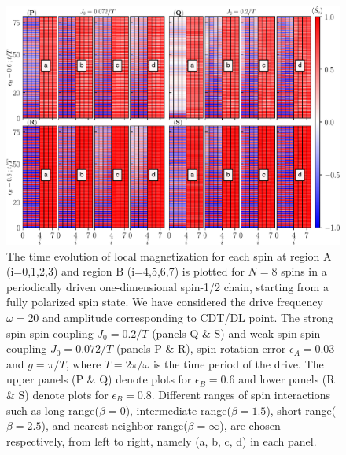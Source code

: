 \documentclass[12pt]{iopart}
\begin{document}
\begin{figure}[t!]
	\centering
	\hspace{2cm}\includegraphics[width=13.5cm]{figure7.pdf}
	\caption{The time evolution of local magnetization for each spin at region A (i=0,1,2,3) and region B (i=4,5,6,7) is plotted for $N=8$ spins in a periodically driven one-dimensional spin-1/2 chain, starting from a fully polarized spin state. We have considered the drive frequency $\omega=20$ and amplitude corresponding to CDT/DL point. The strong spin-spin coupling $J_0 = 0.2/T$ (panels Q \& S) and weak spin-spin coupling $J_0 = 0.072/T$ (panels P \& R),  spin rotation error $\epsilon_A = 0.03$ and $g=\pi/T$, where $T=2\pi/\omega$ is the time period of the drive. The upper panels (P \& Q) denote plots for $\epsilon_B=0.6$ and lower panels (R \& S) denote plots for $\epsilon_B=0.8$. Different ranges of spin interactions such as long-range($\beta=0$), intermediate range($\beta=1.5$), short range($\beta=2.5$), and nearest neighbor range($\beta=\infty$), are chosen respectively, from left to right, namely (a, b, c, d) in each panel.}
	\label{Fig:eb}
\end{figure}
\end{document}
